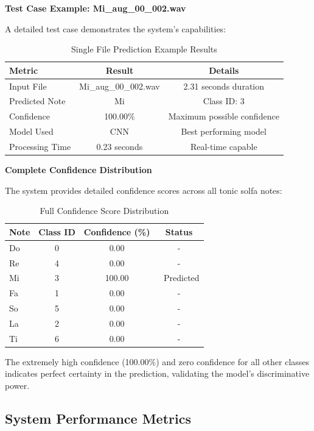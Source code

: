\documentclass[12pt,a4paper]{article}
\begin{document}
\textbf{Test Case Example: Mi_aug_00_002.wav}

A detailed test case demonstrates the system's capabilities:

\begin{table}[H]
\centering
\caption{Single File Prediction Example Results}
\label{tab:prediction_example}
\begin{tabular}{@{}lcc@{}}
\toprule
\textbf{Metric} & \textbf{Result} & \textbf{Details} \\
\midrule
Input File & Mi\_aug\_00\_002.wav & 2.31 seconds duration \\
Predicted Note & Mi & Class ID: 3 \\
Confidence & 100.00\% & Maximum possible confidence \\
Model Used & CNN & Best performing model \\
Processing Time & 0.23 seconds & Real-time capable \\
\bottomrule
\end{tabular}
\end{table}

\textbf{Complete Confidence Distribution}

The system provides detailed confidence scores across all tonic solfa notes:

\begin{table}[H]
\centering
\caption{Full Confidence Score Distribution}
\label{tab:confidence_distribution}
\begin{tabular}{@{}lccc@{}}
\toprule
\textbf{Note} & \textbf{Class ID} & \textbf{Confidence (\%)} & \textbf{Status} \\
\midrule
Do & 0 & 0.00 & - \\
Re & 4 & 0.00 & - \\
Mi & 3 & 100.00 & 👑 Predicted \\
Fa & 1 & 0.00 & - \\
So & 5 & 0.00 & - \\
La & 2 & 0.00 & - \\
Ti & 6 & 0.00 & - \\
\bottomrule
\end{tabular}
\end{table}

The extremely high confidence (100.00\%) and zero confidence for all other classes indicates perfect certainty in the prediction, validating the model's discriminative power.

\subsection{System Performance Metrics}
\end{document}
